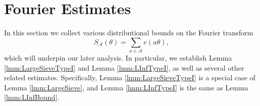 \documentclass[10pt]{amsart}
\theoremstyle{plain}
\numberwithin{sblmm}{thrm}
\numberwithin{equation}{section}
\begin{document}
%
%
%
%
%
%
\section{Fourier Estimates} \label{sec:Fourier}
%
%
%
In this section we collect various distributional bounds on the Fourier transform
\[
S_{\mathcal{A}}(\theta)=\sum_{a\in\mathcal{A}}e(a\theta),
\]
which will underpin our later analysis. In particular, we establish Lemma \ref{lmm:LargeSieveTypeI} and Lemma \ref{lmm:LInfTypeI}, as well as several other related estimates. Specifically, Lemma \ref{lmm:LargeSieveTypeI} is a special case of Lemma \ref{lmm:LargeSieve}, and Lemma \ref{lmm:LInfTypeI} is the same as Lemma \ref{lmm:LInfBound}.
\end{document}
